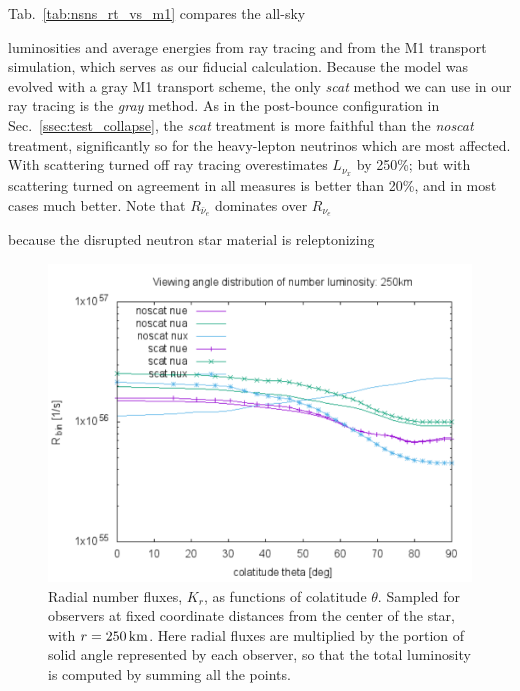 \documentclass[aps,floatfix,prd,superscriptaddress,twocolumn]{revtex4-1}
\newcommand{\todo}[1]{\marginpar{\tiny{\textcolor{red}{#1}}}}
\renewcommand\todo[1]{} %
\begin{document}
Tab.~\ref{tab:nsns_rt_vs_m1} compares the all-sky
\todo{get accurate M1 numbers from Francois}
luminosities and average energies from ray tracing and from
the M1 transport simulation,
which serves as our fiducial calculation.
Because the model was evolved with a gray M1 transport scheme,
the only \emph{scat} method we can use in our ray tracing is the
\emph{gray} method.
As in the post-bounce configuration in Sec.~\ref{ssec:test_collapse},
the \emph{scat} treatment is more faithful than the \emph{noscat} treatment,
significantly so for the heavy-lepton neutrinos which are most affected.
With scattering turned off ray tracing overestimates $L_{\nu_x}$ by 250\%;
but with scattering turned on agreement in all measures
is better than 20\%, and in most cases much better.
Note that $R_{\bar{\nu}_e}$ dominates over $R_{\nu_e}$
\todo{Need $R$ magnitude not just difference}
because the disrupted neutron star material is releptonizing

\begin{figure}
  \includegraphics[width=\columnwidth]{theta_distrib-250km-luminosity_R}
  \caption{Radial number fluxes, $K_r$, as functions of colatitude $\theta$.
    Sampled for observers at fixed coordinate distances from the center
    of the star, with $r=250\,{\rm km}$.
    Here radial fluxes are multiplied by the portion of solid angle
    represented by each observer, so that the total luminosity is
    computed by summing all the points.}
  \label{fig:nsns_theta_distrib_R}
\end{figure}
\end{document}
